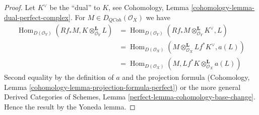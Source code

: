 \documentclass[10pt,a4paper]{amsart}
\theoremstyle{plain}
\theoremstyle{definition}
\theoremstyle{remark}
\numberwithin{equation}{subsection}
\def\Hom{\mathop{\mathrm{Hom}}\nolimits}
\def\QCoh{\mathit{QCoh}}
\begin{document}
\begin{proof}
Let $K^\vee$ be the ``dual'' to $K$, see
Cohomology, Lemma \ref{cohomology-lemma-dual-perfect-complex}.
For $M \in D_\QCoh(\mathcal{O}_X)$ we have
\begin{align*}
\Hom_{D(\mathcal{O}_Y)}(Rf_*M, K \otimes^\mathbf{L}_{\mathcal{O}_Y} L)
& =
\Hom_{D(\mathcal{O}_Y)}(
Rf_*M \otimes^\mathbf{L}_{\mathcal{O}_Y} K^\vee, L) \\
& =
\Hom_{D(\mathcal{O}_X)}(
M \otimes^\mathbf{L}_{\mathcal{O}_X} Lf^*K^\vee, a(L)) \\
& =
\Hom_{D(\mathcal{O}_X)}(M,
Lf^*K \otimes^\mathbf{L}_{\mathcal{O}_X} a(L))
\end{align*}
Second equality by the definition of $a$ and the projection formula
(Cohomology, Lemma \ref{cohomology-lemma-projection-formula-perfect})
or the more general Derived Categories of Schemes, Lemma
\ref{perfect-lemma-cohomology-base-change}.
Hence the result by the Yoneda lemma.
\end{proof}
\end{document}
